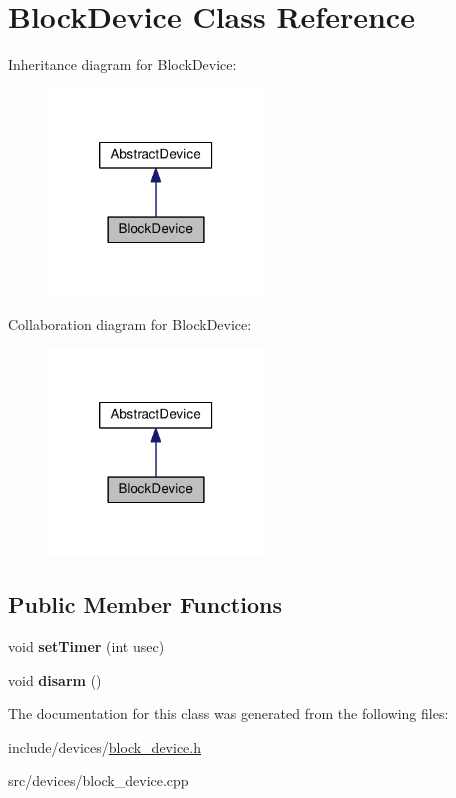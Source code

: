 \hypertarget{classBlockDevice}{\section{\-Block\-Device \-Class \-Reference}
\label{db/d6d/classBlockDevice}
}


\-Inheritance diagram for \-Block\-Device\-:\nopagebreak
\begin{figure}[H]
\begin{center}
\leavevmode
\includegraphics[width=162pt]{d0/d85/classBlockDevice__inherit__graph}
\end{center}
\end{figure}


\-Collaboration diagram for \-Block\-Device\-:\nopagebreak
\begin{figure}[H]
\begin{center}
\leavevmode
\includegraphics[width=162pt]{d4/df3/classBlockDevice__coll__graph}
\end{center}
\end{figure}
\subsection*{\-Public \-Member \-Functions}
\begin{DoxyCompactItemize}
\item 
\hypertarget{classBlockDevice_a7ff2350ac492e4a73a4b59f9a6bbe629}{void {\bfseries set\-Timer} (int usec)}\label{db/d6d/classBlockDevice_a7ff2350ac492e4a73a4b59f9a6bbe629}

\item 
\hypertarget{classBlockDevice_a442a9657bc83b00f9662138f6f23f925}{void {\bfseries disarm} ()}\label{db/d6d/classBlockDevice_a442a9657bc83b00f9662138f6f23f925}

\end{DoxyCompactItemize}


\-The documentation for this class was generated from the following files\-:\begin{DoxyCompactItemize}
\item 
include/devices/\hyperlink{block__device_8h}{block\-\_\-device.\-h}\item 
src/devices/block\-\_\-device.\-cpp\end{DoxyCompactItemize}

